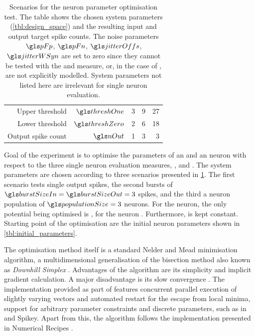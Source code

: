 \begin{table}[t]
\begin{tabular}{rrrrr}
		Upper threshold & $\threshOne$ & 3 & 9 & 27\\
		Lower threshold & $\threshZero$ & 2 & 6 & 18\\
		Output spike count & $\nOut$ & 1 & 3 & 3\\
 		\bottomrule
	\end{tabular}
	\caption[Scenarios for neuron parameter optimisation]{Scenarios for the neuron parameter optimisation test. The table shows the chosen system parameters (\cref{tbl:design_space}) and the resulting input and output target spike counts. The noise parameters $\pFp$, $\pFn$, $\jitterOffs$, $\jitterWSyn$ are set to zero since they cannot be tested with the \SGSO and \SGMO measure, or, in the case of \jitterOffs, are not explicitly modelled. System parameters not listed here are irrelevant for single neuron evaluation.}
	\label{tbl:scenarios}
\end{table}
Goal of the experiment is to optimise the parameters of an \LIF and an \AdEx neuron with respect to the three single neuron evaluation measures, \STII, \SGSO and \SGMO. The system parameters are chosen according to three scenarios presented in \cref{tbl:scenarios}. The first scenario tests single output spikes, the second bursts of $\burstSizeIn = \burstSizeOut = 3$ spikes, and the third a neuron population of $\populationSize = 3$ neurons. For the \LIF neuron, the only potential being optimised is \ETh, for the \AdEx neuron \EThEff. Furthermore, \Cm is kept constant. Starting point of the optimisation are the initial neuron parameters \nParams shown in \cref{tbl:initial_parameters}.

The optimisation method itself is a standard Nelder and Mead minimisation algorithm, a multidimensional generalisation of the bisection method also known as \emph{Downhill Simplex} \cite{nelder1965simplex}. Advantages of the algorithm are its simplicity and implicit gradient calculation. A major disadvantage is its slow convergence \cite{press2007numerical_downhill}. The implementation provided as part of \AdExpSim features concurrent parallel execution of slightly varying vectors and automated restart for the escape from local minima, support for arbitrary parameter constraints and discrete parameters, such as \wsyn in \mbox{\NMPM} and Spikey. Apart from this, the algorithm follows the implementation presented in Numerical Recipes \cite{press2007numerical_downhill}.

